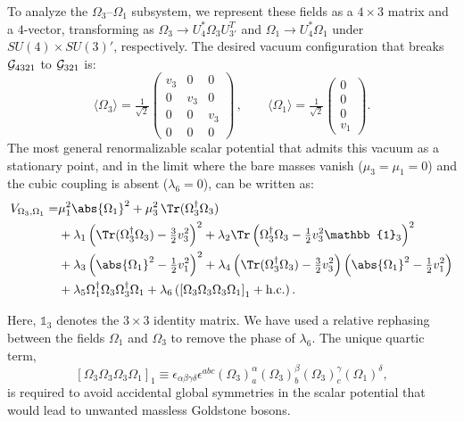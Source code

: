 To analyze the $\Omega_3$--$\Omega_1$ subsystem, we represent these fields as a $4 \times 3$ matrix and a $4$-vector, transforming as $\Omega_3 \to U^*_4 \Omega_3 U_{3'}^T$ and $\Omega_1 \to U^*_4 \Omega_1$ under $SU(4) \times SU(3)'$, respectively. The desired vacuum configuration that breaks $\mathcal{G}_{\rm 4321}$ to $\mathcal{G}_{\rm 321}$ is:
\begin{equation}
\label{vevconf}
\langle \Omega_3 \rangle = 
\tfrac{1}{\sqrt{2}}
\left(
\begin{array}{ccc}
v_3 & 0 & 0 \\
0 & v_3 & 0 \\ 
0 & 0 & v_3 \\
0 & 0 & 0
\end{array}
\right) \, , \qquad
\langle \Omega_1 \rangle = 
\tfrac{1}{\sqrt{2}}
\left(
\begin{array}{c}
0 \\ 
0 \\ 
0 \\
v_1
\end{array}
\right).
\end{equation}
The most general renormalizable scalar potential that admits this vacuum as a stationary point, and in the limit where the bare masses vanish ($\mu_3 = \mu_1 = 0$) and the cubic coupling is absent ($\lambda_6 = 0$), can be written as:
{\small
\begin{equation}\label{eqscalpot}
\begin{aligned}
V_{\Omega_{3},\Omega_{1}}
= & \mu_1^2 \abs{\Omega_1}^2 + \mu_3^2 \, \Tr (\Omega_3^\dag \Omega_3) 
\\&+ \lambda_1 \left( \Tr (\Omega_3^\dag \Omega_3) - \tfrac{3}{2} v_3^2 \right)^2 
+ \lambda_2 \Tr \left( \Omega_3^\dag \Omega_3 - \tfrac{1}{2} v_3^2 \mathbb{1}_3 \right)^2 \\
& 
+\lambda_3 \left( \abs{\Omega_1}^2 - \tfrac{1}{2} v_1^2 \right)^2 
+ \lambda_4 \left( \Tr (\Omega_3^\dag \Omega_3) - \tfrac{3}{2} v_3^2 \right) \left( \abs{\Omega_1}^2 - \tfrac{1}{2} v_1^2 \right)  \\
& + \lambda_5 \Omega_1^\dag \Omega_3 \Omega_3^\dag \Omega_1 + \lambda_6 \left( \left[ \Omega_3 \Omega_3 \Omega_3 \Omega_1 \right]_1 + \text{h.c.} \right).
\end{aligned}  
\end{equation}
}

\noindent
Here, $\mathbb{1}_3$ denotes the $3\times 3$ identity matrix. We have used a relative rephasing between the fields $\Omega_{1}$ and $\Omega_{3}$ to remove the phase of $\lambda_6$. The unique quartic term,
\begin{equation}
  \left[ \Omega_3 \Omega_3 \Omega_3 \Omega_1 \right]_1 \equiv 
\epsilon_{\alpha\beta\gamma\delta} \epsilon^{abc} (\Omega_3)^\alpha_a (\Omega_3)^\beta_b (\Omega_3)^\gamma_c (\Omega_1)^\delta,
\end{equation}
is required to avoid accidental global symmetries in the scalar potential that would lead to unwanted massless Goldstone bosons.

